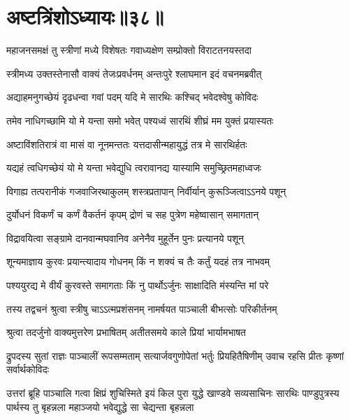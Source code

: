 \chapter{अष्टत्रिंशोऽध्यायः॥३८॥}

\twolineshloka
{महाजनसमक्षं तु स्त्रीणां मध्ये विशेषतः}
{गवाध्यक्षेण सम्प्रोक्तो विराटतनयस्तदा}


\twolineshloka
{स्त्रीमध्य उक्तस्तेनासौ वाक्यं तेजःप्रवर्धनम्}
{अन्तःपुरे श्लाघमान इदं वचनमब्रवीत्}




\twolineshloka
{अद्याहमनुगच्छेयं दृढधन्वा गवां पदम्}
{यदि मे सारथिः कश्चिद् भवेदश्वेषु कोविदः}


\twolineshloka
{तमेव नाधिगच्छामि यो मे यन्ता समो भवेत्}
{पश्यध्वं सारथिं शीघ्रं मम युक्तं प्रयास्यतः}


\twolineshloka
{अष्टाविंशतिरात्रं वा मासं वा नूनमन्ततः}
{यत्तदासीन्महायुद्धं तत्र मे सारथिर्हतः}


\twolineshloka
{यद्यहं त्वधिगच्छेयं यो मे यन्ता भवेद्युधि}
{त्वरावानद्य यास्यामि समुच्छ्रितमहाध्वजः}


\twolineshloka
{विगाह्य तत्परानीकं गजवाजिरथाकुलम्}
{शस्त्रप्रतापान् निर्वीर्यान् कुरूञ्जित्वाऽऽनये पशून्}


\twolineshloka
{दुर्योधनं विकर्णं च कर्णं वैकर्तनं कृपम्}
{द्रोणं च सह पुत्रेण महेष्वासान् समागतान्}


\twolineshloka
{विद्रावयित्वा सङ्ग्रामे दानवान्मघवानिव}
{अनेनैव मुहूर्तेन पुनः प्रत्यानये पशून्}


\twolineshloka
{शून्यमाज्ञाय कुरवः प्रयान्त्यादाय गोधनम्}
{किं न शक्यं च तैः कर्तुं यदहं तत्र नाभवम्}


\twolineshloka
{पश्ययुरद्य मे वीर्यं कुरवस्ते समागताः}
{किं नु पार्थोऽर्जुनः साक्षादिति मंस्यन्ति मां परे}




\twolineshloka
{तस्य तद्वचनं श्रुत्वा स्त्रीषु चाऽऽत्मप्रशंसनम्}
{नामर्षयत पाञ्चाली बीभत्सोः परिकीर्तनम्}


\twolineshloka
{श्रुत्वा तदर्जुनो वाक्यमुत्तरेण प्रभाषितम्}
{अतीतसमये काले प्रियां भार्यामभाषत}


\threelineshloka
{द्रुपदस्य सुतां राज्ञः पाञ्चालीं रूपसम्मताम्}
{सत्यार्जवगुणोपेतां भर्तुः प्रियहितैषिणीम्}
{उवाच रहसि प्रीतः कृष्णां सर्वार्थकोविदः}


\onelineshloka
{उत्तरां ब्रूहि पाञ्चालि गत्वा क्षिप्रं शुचिस्मिते}
\threelineshloka
{इयं किल पुरा युद्धे खाण्डवे सव्यसाचिनः}
{सारथिः पाण्डुपुत्रस्य पार्थस्य तु बृहन्नला}
{महाञ्जयो भवेद्युद्धे सा चेद्यन्ता बृहन्नला}


